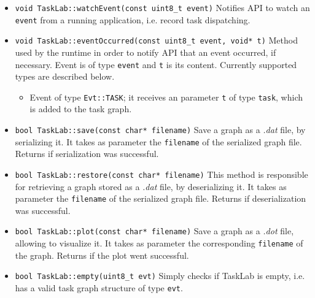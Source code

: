 \begin{itemize}
\item\texttt{void TaskLab::watchEvent(const uint8\_t event)} \newline
Notifies API to watch an \texttt{event} from a running application, i.e. record task dispatching.

\item\texttt{void TaskLab::eventOccurred(const uint8\_t event, void* t)} \newline
Method used by the runtime in order to notify API that an event occurred, if necessary. Event is of type \texttt{event} and \texttt{t} is its content. Currently supported types are described below.
\begin{itemize} 
\item Event of type \texttt{Evt::TASK}; it receives an parameter \texttt{t} of type \texttt{task}, which is added to the task graph.
\end{itemize}

\item \texttt{bool TaskLab::save(const char* filename)} \newline
Save a graph as a \textit{.dat} file, by serializing it. It takes as parameter the \texttt{filename} of the serialized graph file. Returns if serialization was successful.

\item \texttt{bool TaskLab::restore(const char* filename)} \newline
This method is responsible for retrieving a graph stored as a \textit{.dat} file, by deserializing it. It takes as parameter the \texttt{filename} of the serialized graph file. Returns if deserialization was successful.

\item \texttt{bool TaskLab::plot(const char* filename)} \newline
Save a graph as a \textit{.dot} file, allowing to visualize it. It takes as parameter the corresponding \texttt{filename} of the graph. Returns if the plot went successful. 

\item \texttt{bool TaskLab::empty(uint8\_t evt)} \newline
Simply checks if TaskLab is empty, i.e. has a valid task graph structure of type \texttt{evt}.
\end{itemize}

